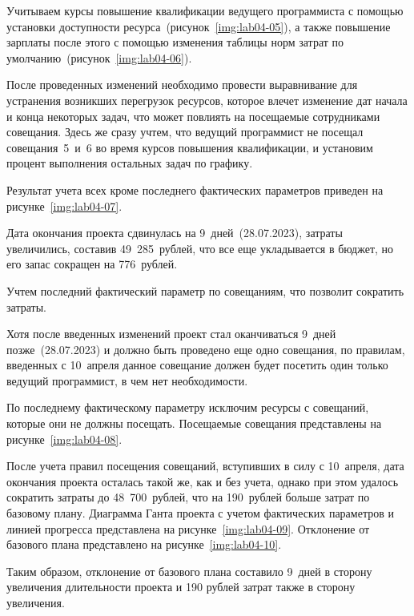 
Учитываем курсы повышение квалификации ведущего программиста с помощью
установки доступности ресурса~(рисунок~\ref{img:lab04-05}), а также повышение
зарплаты после этого с помощью изменения таблицы норм затрат по
умолчанию~(рисунок~\ref{img:lab04-06}).



После проведенных изменений необходимо провести выравнивание для устранения возникших перегрузок ресурсов, которое влечет изменение дат начала и конца некоторых задач, что может повлиять на посещаемые сотрудниками совещания.
Здесь же сразу учтем, что ведущий программист не посещал совещания~5~и~6 во время курсов повышения квалификации, и установим процент выполнения остальных задач по графику.

Результат учета всех кроме последнего фактических параметров приведен на рисунке~\ref{img:lab04-07}.


Дата окончания проекта сдвинулась на 9~дней~(28.07.2023), затраты увеличились, составив 49~285~рублей, что все еще укладывается в бюджет, но его запас сокращен на 776~рублей.

Учтем последний фактический параметр по совещаниям, что позволит сократить затраты.

Хотя после введенных изменений проект стал
оканчиваться 9~дней позже~(28.07.2023) и должно быть проведено еще одно совещания, по правилам, введенных с 10~апреля данное совещание должен будет посетить один только ведущий программист, в чем нет необходимости. 

По последнему фактическому параметру исключим ресурсы с совещаний, которые они не должны посещать. Посещаемые совещания представлены на рисунке~\ref{img:lab04-08}.


После учета правил посещения совещаний, вступивших в силу с 10~апреля, дата окончания проекта осталась такой же, как и без учета, однако при этом удалось сократить затраты до 48~700~рублей, что на 190~рублей больше затрат по базовому плану. Диаграмма Ганта проекта с учетом фактических параметров и линией прогресса представлена на рисунке~\ref{img:lab04-09}. Отклонение от базового плана представлено на рисунке~\ref{img:lab04-10}.



Таким образом, отклонение от базового плана составило 9~дней в сторону увеличения длительности проекта и 190 рублей затрат также в сторону увеличения.